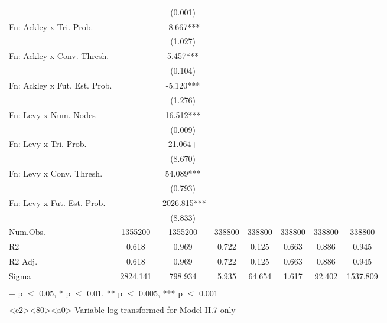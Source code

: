 \begin{table}
\begin{tabular}[t]{lccccccc}
 &  & (0.001) &  &  &  &  & \\
Fn: Ackley x Tri. Prob. &  & -8.667*** &  &  &  &  & \\
 &  & (1.027) &  &  &  &  & \\
Fn: Ackley x Conv. Thresh. &  & 5.457*** &  &  &  &  & \\
 &  & (0.104) &  &  &  &  & \\
Fn: Ackley x Fut. Est. Prob. &  & -5.120*** &  &  &  &  & \\
 &  & (1.276) &  &  &  &  & \\
Fn: Levy x Num. Nodes &  & 16.512*** &  &  &  &  & \\
 &  & (0.009) &  &  &  &  & \\
Fn: Levy x Tri. Prob. &  & 21.064+ &  &  &  &  & \\
 &  & (8.670) &  &  &  &  & \\
Fn: Levy x Conv. Thresh. &  & 54.089*** &  &  &  &  & \\
 &  & (0.793) &  &  &  &  & \\
Fn: Levy x Fut. Est. Prob. &  & -2026.815*** &  &  &  &  & \\
 &  & (8.833) &  &  &  &  & \\
\midrule
Num.Obs. & 1355200 & 1355200 & 338800 & 338800 & 338800 & 338800 & 338800\\
R2 & 0.618 & 0.969 & 0.722 & 0.125 & 0.663 & 0.886 & 0.945\\
R2 Adj. & 0.618 & 0.969 & 0.722 & 0.125 & 0.663 & 0.886 & 0.945\\
Sigma & 2824.141 & 798.934 & 5.935 & 64.654 & 1.617 & 92.402 & 1537.809\\
\bottomrule
\multicolumn{8}{l}{\textsuperscript{} + p $<$ 0.05, * p $<$ 0.01, ** p $<$ 0.005, *** p $<$ 0.001}\\
\multicolumn{8}{l}{\textsuperscript{} <e2><80><a0> Variable log-transformed for Model II.7 only}\\
\end{tabular}
\end{table}
